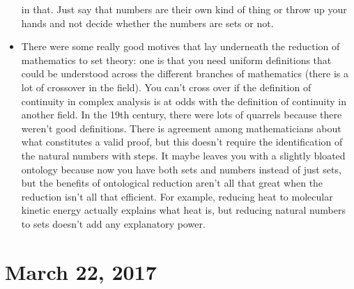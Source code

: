\documentclass[12pt]{article}
\theoremstyle{definition}
\begin{document}
\begin{itemize}
        in that. Just say that numbers are their own kind of thing or throw up
        your hands and not decide whether the numbers are sets or not.
    \item
        There were some really good motives that lay underneath the reduction
        of mathematics to set theory: one is that you need uniform definitions
        that could be understood across the different branches of mathematics
        (there is a lot of crossover in the field). You can't cross over if the
        definition of continuity in complex analysis is at odds with the
        definition of continuity in another field. In the 19th century, there
        were lots of quarrels because there weren't good definitions. There is
        agreement among mathematicians about what constitutes a valid proof,
        but this doesn't require the identification of the natural numbers with
        steps. It maybe leaves you with a slightly bloated ontology because now
        you have both sets and numbers instead of just sets, but the benefits
        of ontological reduction aren't all that great when the reduction isn't
        all that efficient. For example, reducing heat to molecular kinetic
        energy actually explains what heat is, but reducing natural numbers to
        sets doesn't add any explanatory power. 

\end{itemize}

\section{March 22, 2017}

\subsection{}
\end{document}
